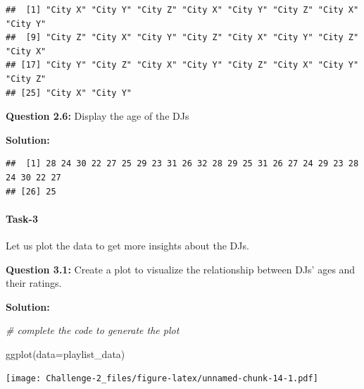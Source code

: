 \documentclass[
]{article}
\newenvironment{Shaded}{\begin{snugshade}}{\end{snugshade}}
\newcommand{\AttributeTok}[1]{\textcolor[rgb]{0.77,0.63,0.00}{#1}}
\newcommand{\CommentTok}[1]{\textcolor[rgb]{0.56,0.35,0.01}{\textit{#1}}}
\newcommand{\FunctionTok}[1]{\textcolor[rgb]{0.00,0.00,0.00}{#1}}
\newcommand{\NormalTok}[1]{#1}
\newcommand{\SpecialCharTok}[1]{\textcolor[rgb]{0.00,0.00,0.00}{#1}}
\begin{document}
\begin{Shaded}
\end{Shaded}

\begin{verbatim}
##  [1] "City X" "City Y" "City Z" "City X" "City Y" "City Z" "City X" "City Y"
##  [9] "City Z" "City X" "City Y" "City Z" "City X" "City Y" "City Z" "City X"
## [17] "City Y" "City Z" "City X" "City Y" "City Z" "City X" "City Y" "City Z"
## [25] "City X" "City Y"
\end{verbatim}

\textbf{Question 2.6:} Display the age of the DJs

\textbf{Solution:}

\begin{Shaded}
\end{Shaded}

\begin{verbatim}
##  [1] 28 24 30 22 27 25 29 23 31 26 32 28 29 25 31 26 27 24 29 23 28 24 30 22 27
## [26] 25
\end{verbatim}

\hypertarget{task-3}{%
\paragraph{Task-3}\label{task-3}}

Let us plot the data to get more insights about the DJs.

\textbf{Question 3.1:} Create a plot to visualize the relationship
between DJs' ages and their ratings.

\textbf{Solution:}

\begin{Shaded}
\begin{Highlighting}[]
\CommentTok{\# complete the code to generate the plot}

\FunctionTok{ggplot}\NormalTok{(}\AttributeTok{data=}\NormalTok{playlist\_data) }
\end{Highlighting}
\end{Shaded}

\texttt{[image: Challenge-2\_files/figure-latex/unnamed-chunk-14-1.pdf]}
\end{document}

